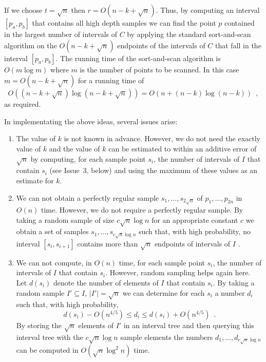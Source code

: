 \documentclass[charterfonts,lotsofwhite]{patmorin}
\begin{document}
If we choose $t=\sqrt{n}$ then $r=O(n-k+\sqrt{n})$.  Thus, by
computing an interval $[p_a,p_b]$ that contains all high depth samples
we can find the point $p$ contained in the largest number of
intervals of $C$ by applying the standard sort-and-scan algorithm
on the $O(n-k+\sqrt{n})$ endpoints of the intervals of $C$ that fall
in the interval $[p_a,p_b]$.  The running time of the
sort-and-scan algorithm is $O(m\log m)$ where $m$ is the number of
points to be scanned.  In this case $m=O(n-k+\sqrt{n})$ for a running
time of 
\[
   O((n-k+\sqrt{n})\log(n-k+\sqrt n)) = O(n + (n-k)\log (n-k)) \enspace ,
\]
as required.

In implementating the above ideas, several issues arise:

\begin{enumerate}

\item The value of $k$ is not known in advance.  However, we do not
need the exactly value of $k$ and the value of $k$ can be estimated to
within an additive error of $\sqrt{n}$ by computing, for each sample
point $s_i$, the number of intervals of $I$ that contain $s_i$ (see
Issue~3, below) and using the maximum of these values as an estimate
for $k$.

\item We can not obtain a perfectly regular sample
$s_1,\ldots,s_{2\sqrt{n}}$ of $p_1,\ldots,p_{2n}$ in $O(n)$ time.
However, we do not require a perfectly regular sample.  By taking a
random sample of size $c\sqrt{n}\log n$ for an appropriate constant
$c$ we obtain a set of samples $s_1,\ldots,s_{c\sqrt{n}\log n}$ such
that, with high probability, no interval $[s_{i},s_{i+1}]$ contains
more than $\sqrt{n}$ endpoints of intervals of $I$ \cite{m98}.

\item We can not compute, in $O(n)$ time, for each sample point $s_i$,
the number of intervals of $I$ that contain $s_i$.  However, random
sampling helps again here.  Let $d(s_i)$ denote the number of elements
of $I$ that contain $s_i$. By taking a random sample $I'\subseteq I$,
$|I'|=\sqrt{n}$ we can determine for each $s_i$ a
number $d_i$ such that, with high probability,
\[
        d(s_i) - O(n^{4/5})\le d_i \le
           d(s_i) + O(n^{4/5}) \enspace .
\]
By storing the $\sqrt{n}$ elements of $I'$ in an interval tree \cite{ps85} and
then querying this interval tree with the $c\sqrt{n}\log n$ sample
elements the numbers $d_1,\ldots,d_{c\sqrt{n}\log n}$ can be computed
in $O(\sqrt{n}\log^2 n)$
time.  
\end{enumerate}
\end{document}
